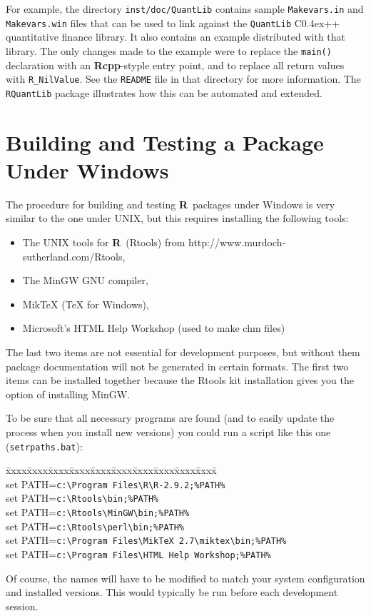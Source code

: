 \documentclass{article}
\newenvironment{program}{\ttfamily\begin{tabbing}
\=xxxx\=xxxx\=xxxx\=xxxx\=xxxx\=xxxx\=xxxx\=xxxx\=xxxx\=xxxx\= \+ \kill \\
}{\end{tabbing}}
\def\C++{C{\raise 0.4ex\hbox{\tiny ++}}}
\newcommand{\R}{{\bf R}}
\newcommand{\Rcpp}{{\bf Rcpp}}
\begin{document}
For example, the directory {\tt inst/doc/QuantLib} contains 
sample {\tt Makevars.in}
and {\tt Makevars.win} files that can be used to link against
the {\tt QuantLib} \C++ quantitative finance library. It also contains
an example distributed with that library. The only changes made to
the example were to replace the {\tt main()} declaration with an
\Rcpp-styple entry point, and to replace all return values with
{\tt R\_NilValue}. See the {\tt README}
file in that directory for more information. The {\tt RQuantLib} package
illustrates how this can be automated and extended.

\section{Building and Testing a Package Under Windows}
\label{sec.windows}

The procedure for building and testing \R\ packages under Windows is very
similar to the one under UNIX, but this requires installing the
following tools:
\begin{itemize}
\item The UNIX tools for \R\ (Rtools)
from http://www.murdoch-sutherland.com/Rtools, 
\item The MinGW GNU compiler,
\item MikTeX (TeX for Windows), 
\item Microsoft's HTML Help Workshop (used to make chm files)
\end{itemize}
The last two items are not essential for development purposes, but
without them package documentation will not be generated in 
certain formats. The first two
items can be installed together because the Rtools kit installation
gives you the option of installing MinGW.

To be sure that all necessary programs are found (and to easily update
the process when you install new versions) you could run a script like
this one ({\tt setrpaths.bat}):
\begin{program}
  set PATH=\verb!c:\Program Files\R\R-2.9.2;%PATH%!\\
  set PATH=\verb!c:\Rtools\bin;%PATH%!\\
  set PATH=\verb!c:\Rtools\MinGW\bin;%PATH%!\\
  set PATH=\verb!c:\Rtools\perl\bin;%PATH%!\\
  set PATH=\verb!c:\Program Files\MikTeX 2.7\miktex\bin;%PATH%!\\
  set PATH=\verb!c:\Program Files\HTML Help Workshop;%PATH%!\\
\end{program}
Of course, the names will have to be modified to match your
system configuration and installed versions. This would typically be run
before each development session.
\end{document}
